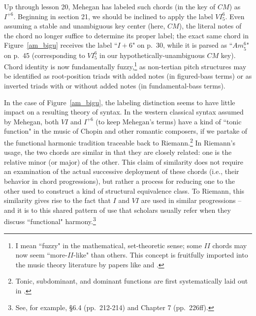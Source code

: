 Up through lesson 20, Mehegan has labeled such chords (in the key of $CM$) as $I^{+6}$.  Beginning in section 21, we should be inclined to apply the label $VI^6_5$.  Even assuming a stable and unambiguous key center (here, $CM$), the literal notes of the chord no longer suffice to determine its proper label; the exact same chord in Figure~\ref{am_bigu} receives the label ``$I+6$" on p.\ 30, while it is parsed as ``$Am^6_5$" on p.\ 45 (corresponding to $VI^6_5$ in our hypothetically-unambiguous $CM$ key).  Chord identity is now fundamentally fuzzy,\footnote{I mean ``fuzzy" in the mathematical, set-theoretic sense; some $II$ chords may now seem ``more-$II$-like" than others.  This concept is fruitfully imported into the music theory literature by papers like \cite{quinn1997} and \cite{quinn2001}.} as non-tertian pitch structures may be identified as root-position triads with added notes (in figured-bass terms) or as inverted triads with or without added notes (in fundamental-bass terms).

In the case of Figure~\ref{am_bigu}, the labeling distinction seems to have little impact on a resulting theory of syntax.  In the western classical syntax assumed by Mehegan, both $VI$ and $I^{+6}$ (to keep Mehegan's terms) have a kind of ``tonic function" in the music of Chopin and other romantic composers, if we partake of the functional harmonic tradition traceable back to Riemann.\footnote{Tonic, subdominant, and dominant functions are first systematically laid out in \cite{riemann1893}.}  In Riemann's usage, the two chords are similar in that they are closely related: one is the relative minor (or major) of the other.  This claim of similarity does not require an examination of the actual successive deployment of these chords (i.e., their behavior in chord progressions), but rather a process for reducing one to the other used to construct a kind of structural equivalence class.  To Riemann, this similarity gives rise to the fact that $I$ and $VI$ are used in similar progressions -- and it is to this shared pattern of use that scholars usually refer when they discuss ``functional" harmony.\footnote{See, for example, \cite{tymoczko2010} \S 6.4 (pp.\ 212-214) and Chapter 7 (pp.\ 226ff).}  

